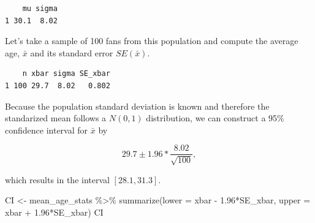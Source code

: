 \documentclass[
  letterpaper,
  DIV=11,
  numbers=noendperiod]{scrreprt}
\newenvironment{Shaded}{\begin{snugshade}}{\end{snugshade}}
\newcommand{\AttributeTok}[1]{\textcolor[rgb]{0.40,0.45,0.13}{#1}}
\newcommand{\DecValTok}[1]{\textcolor[rgb]{0.68,0.00,0.00}{#1}}
\newcommand{\FloatTok}[1]{\textcolor[rgb]{0.68,0.00,0.00}{#1}}
\newcommand{\FunctionTok}[1]{\textcolor[rgb]{0.28,0.35,0.67}{#1}}
\newcommand{\NormalTok}[1]{\textcolor[rgb]{0.00,0.23,0.31}{#1}}
\newcommand{\OtherTok}[1]{\textcolor[rgb]{0.00,0.23,0.31}{#1}}
\newcommand{\SpecialCharTok}[1]{\textcolor[rgb]{0.37,0.37,0.37}{#1}}
\theoremstyle{definition}
\theoremstyle{remark}
\begin{document}
\begin{verbatim}
    mu sigma
1 30.1  8.02
\end{verbatim}

Let's take a sample of 100 fans from this population and compute the
average age, \(\bar{x}\) and its standard error \(SE(\bar{x})\).

\begin{Shaded}
\end{Shaded}

\begin{verbatim}
    n xbar sigma SE_xbar
1 100 29.7  8.02   0.802
\end{verbatim}

Because the population standard deviation is known and therefore the
standarized mean follows a \(N(0,1)\) distribution, we can construct a
95\% confidence interval for \(\bar{x}\) by

\[29.7 \pm 1.96*\frac{8.02}{\sqrt{100}},\]

which results in the interval \([28.1, 31.3]\).

\begin{Shaded}
\begin{Highlighting}[]
\NormalTok{CI }\OtherTok{\textless{}{-}}\NormalTok{ mean\_age\_stats }\SpecialCharTok{\%\textgreater{}\%} 
  \FunctionTok{summarize}\NormalTok{(}\AttributeTok{lower =}\NormalTok{ xbar }\SpecialCharTok{{-}} \FloatTok{1.96}\SpecialCharTok{*}\NormalTok{SE\_xbar,}
            \AttributeTok{upper =}\NormalTok{ xbar }\SpecialCharTok{+} \FloatTok{1.96}\SpecialCharTok{*}\NormalTok{SE\_xbar)}
\NormalTok{CI}
\end{Highlighting}
\end{Shaded}
\end{document}
